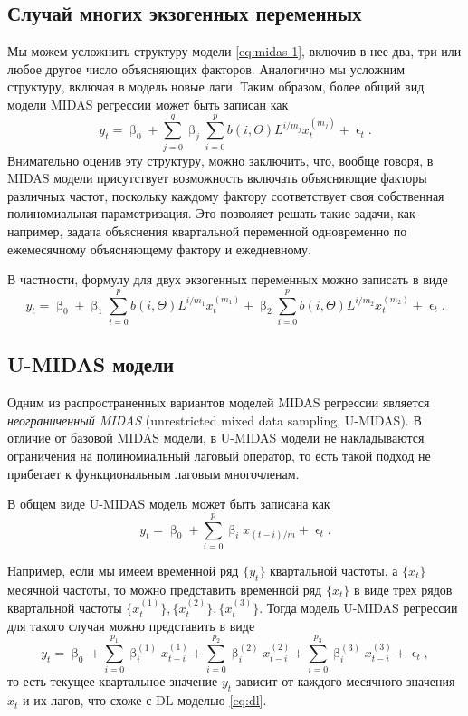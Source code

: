 \documentclass[a4paper, 14pt]{extreport}
\numberwithin{equation}{section}
\renewcommand{\beta}{\upbeta}
\renewcommand{\epsilon}{\upvarepsilon}
\numberwithin{equation}{section}
\begin{document}
	\subsection{Случай многих экзогенных переменных}
	Мы можем усложнить структуру модели \eqref{eq:midas-1}, включив в нее два, три или любое другое число объясняющих факторов. Аналогично мы усложним структуру, включая в модель новые лаги. Таким образом, более общий вид модели MIDAS регрессии может быть записан как 
	\begin{equation}
		y_t = \beta_0 + \sum_{j=0}^{q} \beta_j \sum_{i=0}^{p} b(i,\Theta) L^{i/m_j} x_t^{(m_j)} + \epsilon_t.
	\end{equation}
	Внимательно оценив эту структуру, можно заключить, что, вообще говоря, в MIDAS модели присутствует возможность включать объясняющие факторы различных частот, поскольку каждому фактору соответствует своя собственная полиномиальная параметризация. Это позволяет решать такие задачи, как например, задача объяснения квартальной переменной одновременно по ежемесячному объясняющему фактору и ежедневному.
	
	В частности, формулу для двух экзогенных переменных можно записать в виде
	\begin{equation}
		y_t = \beta_0 + \beta_1\sum_{i=0}^{p} b(i,\Theta) L^{i/m_1} x_t^{(m_1)} + \beta_2\sum_{i=0}^{p} b(i,\Theta) L^{i/m_2} x_t^{(m_2)} + \epsilon_t.
	\end{equation}
	
	\subsection{U-MIDAS модели}
	Одним из распространенных вариантов моделей MIDAS регрессии является \textit{неограниченный MIDAS} (unrestricted mixed data sampling, U-MIDAS). В отличие от базовой MIDAS модели, в U-MIDAS модели не накладываются ограничения на полиномиальный лаговый оператор, то есть такой подход не прибегает к функциональным лаговым многочленам.
	
	В общем виде U-MIDAS модель может быть записана как
		\begin{equation}\label{eq:u-midas-1}
		y_t = \beta_0 + \sum_{i=0}^{p} \beta_i x_{(t-i)/m} + \epsilon_t.
	\end{equation}
	
	Например, если мы имеем временной ряд $\{y_t\}$ квартальной частоты, а $\{x_t\}$ месячной частоты, то можно представить временной ряд $\{x_t\}$ в виде трех рядов квартальной частоты $\{x_t^{(1)}\}, \{x_t^{(2)}\}, \{x_t^{(3)}\}$. Тогда модель U-MIDAS регрессии для такого случая можно представить в виде
	\begin{equation}\label{eq:u-midas-2}
		y_t = \beta_0 + \sum_{i=0}^{p_1} \beta_i^{(1)} x_{t-i}^{(1)} + \sum_{i=0}^{p_2} \beta_i^{(2)} x_{t-i}^{(2)} + \sum_{i=0}^{p_3} \beta_i^{(3)} x_{t-i}^{(3)} + \epsilon_t,
	\end{equation}
	то есть текущее квартальное значение $y_t$ зависит от каждого месячного значения $x_t$ и их лагов, что схоже с DL моделью \eqref{eq:dl}.
	
\end{document}
